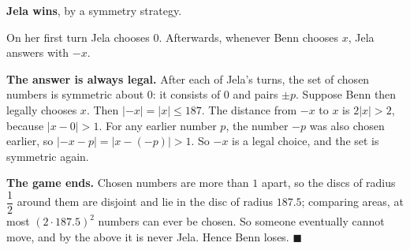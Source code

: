 \textbf{Jela wins}, by a symmetry strategy.

On her first turn Jela chooses $0$. Afterwards, whenever Benn chooses $x$, Jela answers with $-x$.

\textbf{The answer is always legal.} After each of Jela's turns, the set of chosen numbers is symmetric about $0$: it consists of $0$ and pairs $\pm p$. Suppose Benn then legally chooses $x$. Then $|-x|=|x|\le187$. The distance from $-x$ to $x$ is $2|x|>2$, because $|x-0|>1$. For any earlier number $p$, the number $-p$ was also chosen earlier, so $|-x-p|=|x-(-p)|>1$. So $-x$ is a legal choice, and the set is symmetric again.

\textbf{The game ends.} Chosen numbers are more than $1$ apart, so the discs of radius $\dfrac12$ around them are disjoint and lie in the disc of radius $187.5$; comparing areas, at most $(2\cdot187.5)^2$ numbers can ever be chosen. So someone eventually cannot move, and by the above it is never Jela. Hence Benn loses. $\blacksquare$
